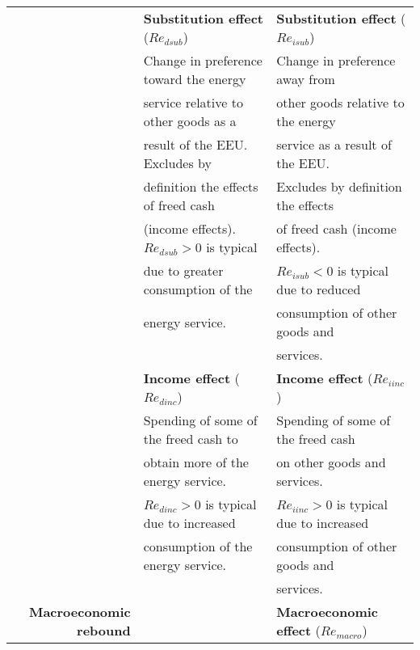 \begin{table}
\begin{center}
\begin{tabular}{ r l l }
                                   & \textbf{Substitution effect} ($Re_{dsub}$)   & \textbf{Substitution effect} ($Re_{isub}$) \\
                                   & Change in preference toward the energy       & Change in preference away from  \\
                                   & service relative to other goods as a         & other goods relative to the energy  \\
                                   & result of the EEU. Excludes by               & service as a result of the EEU.  \\
                                   & definition the effects of freed cash         & Excludes by definition the effects \\ 
                                   & (income effects). $Re_{dsub} > 0$ is typical & of freed cash (income effects).     \\ 
                                   & due to greater consumption of the            & $Re_{isub} < 0$ is typical due to reduced    \\
                                   & energy service.                              & consumption of other goods and   \\
                                   &                                              & services. \\
                                   \cmidrule{2-3}
                                   & \textbf{Income effect} ($Re_{dinc}$)         & \textbf{Income effect} ($Re_{iinc}$) \\
                                   & Spending of some of the freed cash to        & Spending of some of the freed cash   \\
                                   & obtain more of the energy service.           & on other goods and services.   \\
                                   & $Re_{dinc} > 0$ is typical due to increased  & $Re_{iinc} > 0$ is typical due to increased    \\ 
                                   & consumption of the energy service.           & consumption of other goods and   \\
                                   &                                              & services. \\
\midrule
\textbf{Macroeconomic rebound}     &                                              & \textbf{Macroeconomic effect} ($Re_{macro}$) \\

\end{tabular}
\end{center}
\end{table}
